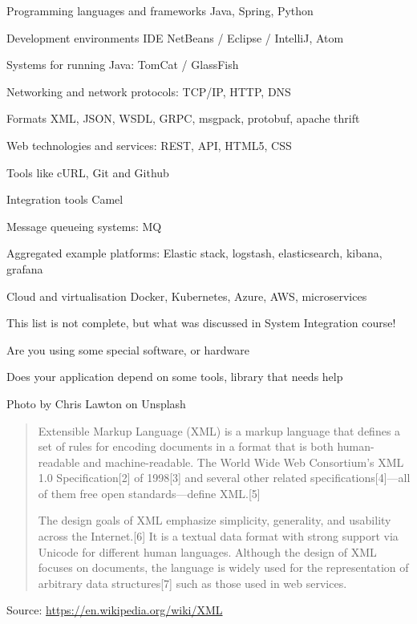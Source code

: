 \documentclass[Screen16to9,17pt]{foils}
\begin{document}
\begin{list2}
\item Programming languages and frameworks Java, Spring, Python
\item Development environments IDE NetBeans / Eclipse / IntelliJ, Atom
\item Systems for running Java: TomCat / GlassFish
\item Networking and network protocols: TCP/IP, HTTP, DNS
\item Formats XML, JSON, WSDL, GRPC, msgpack, protobuf, apache thrift
\item Web technologies and services: REST, API, HTML5, CSS
\item Tools like cURL, Git and Github
\item Integration tools Camel
\item Message queueing systems: MQ
\item Aggregated example platforms: Elastic stack, logstash, elasticsearch, kibana, grafana
\item Cloud and virtualisation Docker, Kubernetes, Azure, AWS, microservices
\end{list2}

\centerline{This list is not complete, but what was discussed in System Integration course!}






\begin{list2}
\item Are you using some special software, or hardware
\item Does your application depend on some tools, library that needs help
\end{list2}







Photo by Chris Lawton on Unsplash


\begin{quote}
  Extensible Markup Language (XML) is a markup language that defines a set of rules for encoding documents in a format that is both human-readable and machine-readable. The World Wide Web Consortium's XML 1.0 Specification[2] of 1998[3] and several other related specifications[4]—all of them free open standards—define XML.[5]

  The design goals of XML emphasize simplicity, generality, and usability across the Internet.[6] It is a textual data format with strong support via Unicode for different human languages. Although the design of XML focuses on documents, the language is widely used for the representation of arbitrary data structures[7] such as those used in web services.
\end{quote}
Source: \url{https://en.wikipedia.org/wiki/XML}
\end{document}
